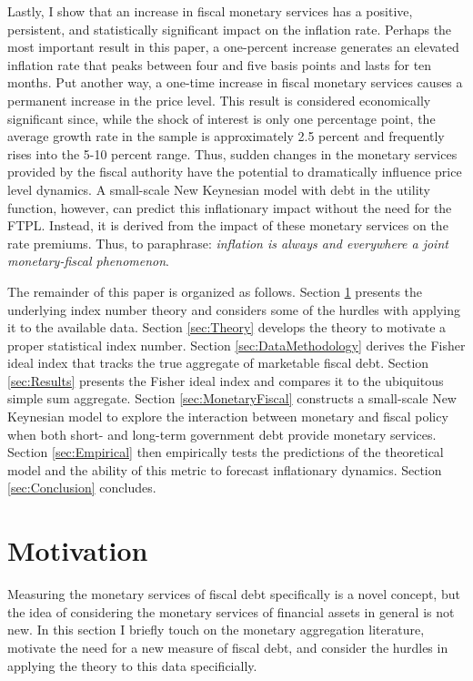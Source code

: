 \documentclass[11pt,a4paper,margin=1.5in]{article}
\begin{document}
Lastly, I show that an increase in fiscal monetary services has a positive, persistent, and statistically significant impact on the inflation rate.
Perhaps the most important result in this paper, a one-percent increase generates an elevated inflation rate that peaks between four and five basis points and lasts for ten months. 
Put another way, a one-time increase in fiscal monetary services causes a permanent increase in the price level. 
This result is considered economically significant since, while the shock of interest is only one percentage point, the average growth rate in the sample is approximately 2.5 percent and frequently rises into the 5-10 percent range.
Thus, sudden changes in the monetary services provided by the fiscal authority have the potential to dramatically influence price level dynamics.
A small-scale New Keynesian model with debt in the utility function, however, can predict this inflationary impact without the need for the FTPL. 
Instead, it is derived from the impact of these monetary services on the rate premiums. 
Thus, to paraphrase: {\em inflation is always and everywhere a joint monetary-fiscal phenomenon}.


The remainder of this paper is organized as follows.
Section \ref{sec:MonAgg} presents the underlying index number theory and considers some of the hurdles with applying it to the available data.
Section \ref{sec:Theory} develops the theory to motivate a proper statistical index number.
Section \ref{sec:DataMethodology} derives the Fisher ideal index that tracks the true aggregate of marketable fiscal debt.
Section \ref{sec:Results} presents the Fisher ideal index and compares it to the ubiquitous simple sum aggregate.
Section \ref{sec:MonetaryFiscal} constructs a small-scale New Keynesian model to explore the interaction between monetary and fiscal policy when both short- and long-term government debt provide monetary services.
Section \ref{sec:Empirical} then empirically tests the predictions of the theoretical model and the ability of this metric to forecast inflationary dynamics.
Section \ref{sec:Conclusion} concludes.


\section{Motivation}
\label{sec:MonAgg}
Measuring the monetary services of fiscal debt specifically is a novel concept, but the idea of considering the monetary services of financial assets in general is not new.
In this section I briefly touch on the monetary aggregation literature, motivate the need for a new measure of fiscal debt, and consider the hurdles in applying the theory to this data specificially. 
\end{document}
